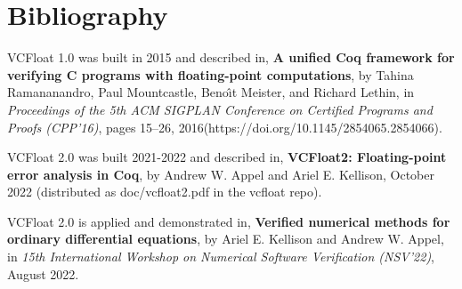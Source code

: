 \documentclass[article]{memoir}
\begin{document}
\chapter{Bibliography}

\quad VCFloat 1.0 was built in 2015 and described in,\newline
\textbf{A unified Coq framework for verifying C programs with floating-point computations}, by Tahina Ramananandro, Paul Mountcastle, Beno\^{\i}t  Meister, and Richard Lethin, in \emph{Proceedings of the 5th ACM SIGPLAN Conference on Certified Programs and Proofs (CPP'16)}, pages 15--26, 2016\newline (https://doi.org/10.1145/2854065.2854066).
\vspace\baselineskip

VCFloat 2.0 was built 2021-2022 and described in,\newline
\textbf{VCFloat2: Floating-point error analysis in Coq},
by Andrew W. Appel and Ariel E. Kellison,
October 2022  (distributed as doc/vcfloat2.pdf in the vcfloat repo).
\vspace\baselineskip

VCFloat 2.0 is applied and demonstrated in,\newline
\textbf{Verified numerical methods for ordinary differential equations},
by Ariel E. Kellison and Andrew W. Appel,
in \emph{15th International Workshop on Numerical Software Verification (NSV'22)}, August 2022.
\end{document}

